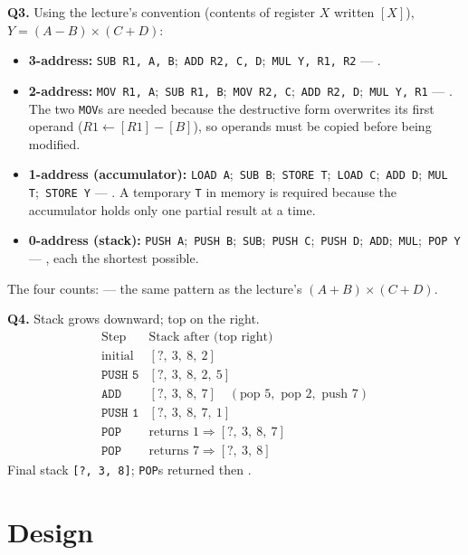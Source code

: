 \documentclass[11pt]{article}
\begin{document}
\textbf{Q3.} Using the lecture's convention (contents of register $X$ written $[X]$), $Y = (A-B) \times (C+D)$:
\begin{itemize}
  \item \textbf{3-address:} \texttt{SUB R1, A, B};\ \texttt{ADD R2, C, D};\ \texttt{MUL Y, R1, R2} \;—\; .
  \item \textbf{2-address:} \texttt{MOV R1, A};\ \texttt{SUB R1, B};\ \texttt{MOV R2, C};\ \texttt{ADD R2, D};\ \texttt{MUL Y, R1} \;—\; . The two \texttt{MOV}s are needed because the destructive form overwrites its first operand ($R1 \gets [R1] - [B]$), so operands must be copied before being modified.
  \item \textbf{1-address (accumulator):} \texttt{LOAD A};\ \texttt{SUB B};\ \texttt{STORE T};\ \texttt{LOAD C};\ \texttt{ADD D};\ \texttt{MUL T};\ \texttt{STORE Y} \;—\; . A temporary \texttt{T} in memory is required because the accumulator holds only one partial result at a time.
  \item \textbf{0-address (stack):} \texttt{PUSH A};\ \texttt{PUSH B};\ \texttt{SUB};\ \texttt{PUSH C};\ \texttt{PUSH D};\ \texttt{ADD};\ \texttt{MUL};\ \texttt{POP Y} \;—\; , each the shortest possible.
\end{itemize}
The four counts:  --- the same pattern as the lecture's $(A{+}B)\times(C{+}D)$.

\textbf{Q4.} Stack grows downward; top on the right.
\[
\begin{array}{c|l}
\text{Step} & \text{Stack after (top right)} \\
\hline
\text{initial} & [?,\ 3,\ 8,\ 2] \\
\texttt{PUSH 5} & [?,\ 3,\ 8,\ 2,\ 5] \\
\texttt{ADD}     & [?,\ 3,\ 8,\ 7] \quad (\text{pop }5,\text{ pop }2,\text{ push }7) \\
\texttt{PUSH 1}  & [?,\ 3,\ 8,\ 7,\ 1] \\
\texttt{POP}     & \text{returns }1 \Rightarrow [?,\ 3,\ 8,\ 7] \\
\texttt{POP}     & \text{returns }7 \Rightarrow [?,\ 3,\ 8]
\end{array}
\]
Final stack \texttt{[?, 3, 8]}; \texttt{POP}s returned  then .

\section{Design}
\end{document}
